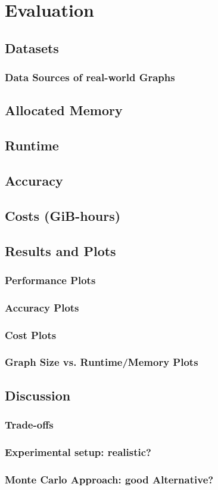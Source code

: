 \section{Evaluation}


\subsection{Datasets}
\subsubsection{Data Sources of real-world Graphs}

\subsection{Allocated Memory}

\subsection{Runtime}

\subsection{Accuracy}

\subsection{Costs (GiB-hours)}

\subsection{Results and Plots}
\subsubsection{Performance Plots}
\subsubsection{Accuracy Plots}
\subsubsection{Cost Plots}
\subsubsection{Graph Size vs. Runtime/Memory Plots}

\subsection{Discussion}
\subsubsection{Trade-offs}
\subsubsection{Experimental setup: realistic?}
\subsubsection{Monte Carlo Approach: good Alternative?}
